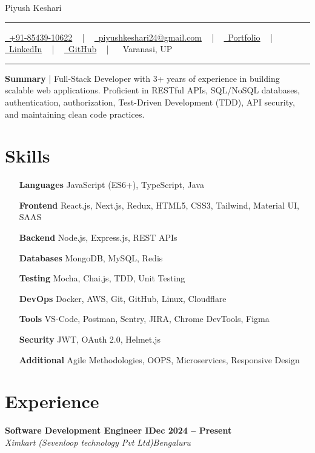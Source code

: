 \documentclass[letterpaper, 10pt]{article}
\newcommand{\documentTitle}[2]{
\begin{center}
    {\Huge\color{accentTitle} #1}
    \vspace{1pt}
    {\color{accentLine} \hrule height 0.8pt}
    \vspace{1pt}
    \footnotesize{#2}
    \vspace{1pt}
    {\color{accentLine} \hrule height 0.8pt}
\end{center}
}
\newcommand{\tinysection}[1]{ \phantomsection
\addcontentsline{toc}{section}{#1}
{\large{\bfseries\color{accentText}#1} {\color{accentLine} |}}
\vspace{1pt}
}
\newcommand{\heading}[2]{ \hspace{5pt}#1\hfill#2\\[1pt] }
\newcommand{\headingBf}[2]{ \heading{\textbf{#1}}{\textbf{#2}} }
\newcommand{\headingIt}[2]{ \heading{\textit{#1}}{\textit{#2}} }
\begin{document}
\documentTitle{Piyush Keshari}{ \href{tel:+918543910622}{ \raisebox{-0.05\height}{\faPhone}\ +91-85439-10622} ~ | ~ \href{mailto:piyushkeshari24@gmail.com}{ \raisebox{-0.15\height}{\faEnvelope}\ piyushkeshari24@gmail.com} ~ | ~ \href{https://kesharipiyush24.github.io/}{ \raisebox{-0.15\height}{\faGlobe}\ Portfolio} ~ | ~ \href{https://linkedin.com/in/piyush-k-ba3a67134}{ \raisebox{-0.15\height}{\faLinkedin}\ LinkedIn} ~ | ~ \href{https://github.com/KeshariPiyush24}{ \raisebox{-0.15\height}{\faGithub}\ GitHub} ~ | ~  \raisebox{-0.15\height}{\faMapMarker}\ Varanasi, UP}

\tinysection{Summary} Full-Stack Developer with 3+ years of experience in building scalable web applications. Proficient in RESTful APIs, SQL/NoSQL databases, authentication, authorization, Test-Driven Development (TDD), API security, and maintaining clean code practices.

\section{Skills}
\begin{multicols}{2}
    \begin{itemize}[itemsep=0.5pt, parsep=0.5pt, leftmargin=65pt]
        \item[\textbf{Languages}] JavaScript (ES6+), TypeScript, Java
        \item[\textbf{Frontend}] React.js, Next.js, Redux, HTML5, CSS3, Tailwind, Material UI, SAAS
        \item[\textbf{Backend}] Node.js, Express.js, REST APIs
        \item[\textbf{Databases}] MongoDB, MySQL, Redis
        \item[\textbf{Testing}] Mocha, Chai.js, TDD, Unit Testing
        \item[\textbf{DevOps}] Docker, AWS, Git, GitHub,
        Linux, Cloudflare
        \item[\textbf{Tools}] VS-Code, Postman, Sentry, JIRA, Chrome DevTools, Figma
        \item[\textbf{Security}] JWT, OAuth 2.0, Helmet.js
        \item[\textbf{Additional}] Agile Methodologies, OOPS, Microservices, Responsive Design
    \end{itemize}
\end{multicols}

\section{Experience}
\headingBf{Software Development Engineer I}{Dec 2024 -- Present}
\headingIt{Ximkart (Sevenloop technology Pvt Ltd)}{Bengaluru}
\end{document}
